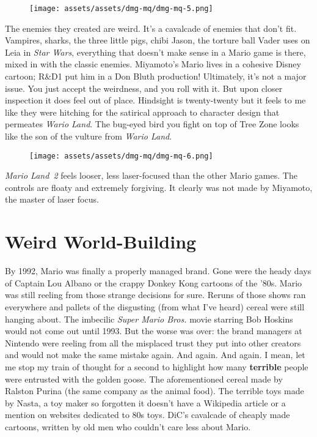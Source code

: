 \documentclass{book}
\begin{document}
\begin{figure}[hbt]
\vskip 10pt
\centering \texttt{[image: assets/assets/dmg-mq/dmg-mq-5.png]}
\vskip 6pt
\end{figure}

The enemies they created are weird. It’s a cavalcade of enemies that don’t fit. Vampires, sharks, the three little pigs, chibi Jason, the torture ball Vader uses on Leia in \emph{Star Wars}, everything that doesn’t make sense in a Mario game is there, mixed in with the classic enemies. Miyamoto’s Mario lives in a cohesive Disney cartoon; R\&D1 put him in a Don Bluth production! Ultimately, it’s not a major issue. You just accept the weirdness, and you roll with it. But upon closer inspection it does feel out of place. Hindsight is twenty-twenty but it feels to me like they were hitching for the satirical approach to character design that permeates \emph{Wario Land}. The bug-eyed bird you fight on top of Tree Zone looks like the son of the vulture from \emph{Wario Land}.

\begin{figure}[hbt]
\vskip 10pt
\centering \texttt{[image: assets/assets/dmg-mq/dmg-mq-6.png]}
\vskip 6pt
\end{figure}

\emph{Mario Land 2} feels looser, less laser-focused than the other Mario games. The controls are floaty and extremely forgiving. It clearly was not made by Miyamoto, the master of laser focus.

\FloatBarrier\needspace{5pt}\section*{Weird World-Building}\nopagebreak[4]

By 1992, Mario was finally a properly managed brand. Gone were the heady days of Captain Lou Albano or the crappy Donkey Kong cartoons of the ’80s. Mario was still reeling from those strange decisions for sure. Reruns of those shows ran everywhere and pallets of the disgusting (from what I’ve heard) cereal were still hanging about. The imbecilic \emph{Super Mario Bros.} movie starring Bob Hoskins would not come out until 1993. But the worse was over: the brand managers at Nintendo were reeling from all the misplaced trust they put into other creators and would not make the same mistake again. And again. And again. I mean, let me stop my train of thought for a second to highlight how many \textbf{terrible} people were entrusted with the golden goose. The aforementioned cereal made by Ralston Purina (the same company as the animal food). The terrible toys made by Nasta, a toy maker so forgotten it doesn’t have a Wikipedia article or a mention on websites dedicated to 80s toys. DiC’s cavalcade of cheaply made cartoons, written by old men who couldn’t care less about Mario.
\end{document}
